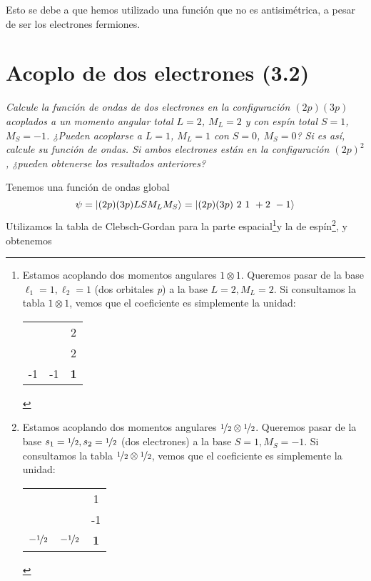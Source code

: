 Esto se debe a que hemos utilizado una función que no es
antisimétrica, a pesar de ser los electrones fermiones.

\chapter{Acoplo de dos electrones (3.2)} 
\begin{tcolorbox}[halign=left]
  \emph{
    Calcule la función de ondas de dos electrones en la configuración
    $(2p)(3p)$ acoplados a un momento angular total $L=2$, $M_L=2$ y
    con espín total $S=1$,$M_S=-1$. ¿Pueden acoplarse a $L=1$, $M_L=1$
    con $S=0$, $M_S=0$? Si es así, calcule su función de ondas. Si
    ambos electrones están en la configuración $(2p)^2$, ¿pueden
    obtenerse los resultados anteriores?
}
\end{tcolorbox}
Tenemos una función de ondas global 
\begin{equation}
\psi = \ket{(2p)(3p) L S  M_L M_S
}=\ket{(2p)(3p)\  2\ 1 \ +2\ -1 }
\end{equation}
Utilizamos la tabla de Clebsch-Gordan para la parte espacial\footnote{Estamos acoplando dos
  momentos angulares $1\otimes1$. Queremos pasar de la base
  $\ell_1=1,\ell_2=1$ (dos orbitales \emph{p}) a la base $L=2,M_L=2$.
  Si consultamos la tabla $1\otimes 1$, vemos que el coeficiente es simplemente la
  unidad:
  \begin{center}
    \begin{tabular}{cc|c|}
      \cline{3-3}
      &    & 2          \\ \cline{3-3} 
      &    & 2          \\ \hline
      \multicolumn{1}{|l|}{-1} & -1 & \textbf{1} \\ \hline
    \end{tabular}
  \end{center}
}y la de espín\footnote{Estamos acoplando dos
  momentos angulares ${\nicefrac{1}{2}}\otimes{\nicefrac{1}{2}}$. Queremos pasar de la base
  $s_1={\nicefrac{1}{2}},s_2={\nicefrac{1}{2}}$ (dos electrones) a la base $S=1,M_S=-1$.
  Si consultamos la tabla ${\nicefrac{1}{2}}\otimes{\nicefrac{1}{2}}$, vemos que el coeficiente es simplemente la
  unidad:
  \begin{center}
    \begin{tabular}{cc|c|}
      \cline{3-3}
      &    & 1          \\ \cline{3-3} 
      &    & -1          \\ \hline
      \multicolumn{1}{|l|}{$-{\nicefrac{1}{2}}$} & $-{\nicefrac{1}{2}}$ & \textbf{1} \\ \hline
    \end{tabular}
  \end{center}
}, y obtenemos



